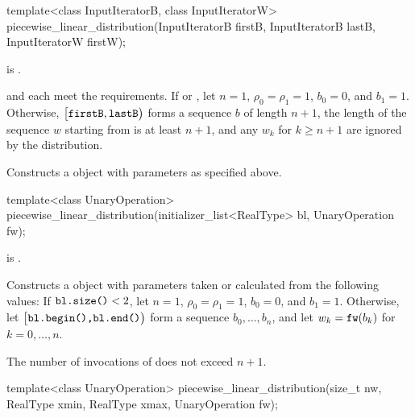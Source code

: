 \begin{itemdecl}
template<class InputIteratorB, class InputIteratorW>
 piecewise_linear_distribution(InputIteratorB firstB, InputIteratorB lastB,
                               InputIteratorW firstW);
\end{itemdecl}

\begin{itemdescr}
\pnum
\mandates
{} is .

\pnum
\expects
   and 
   each meet the
   requirements.
 If 
 or ,
 let $n = 1$,
     $\rho_0 = \rho_1 = 1$,
     $b_0 = 0$,
 and $b_1 = 1$.
 Otherwise,
 $\bigl[\texttt{\protect firstB}, \texttt{\protect lastB}\bigr)$
 forms a sequence $b$ of length $n+1$,
 the length of the sequence $w$ starting from 
 is at least $n+1$,
 and any $w_k$ for $k \geq n + 1$ are ignored by the distribution.

\pnum
\effects
Constructs a  object
 with parameters as specified above.
\end{itemdescr}


%
\begin{itemdecl}
template<class UnaryOperation>
 piecewise_linear_distribution(initializer_list<RealType> bl, UnaryOperation fw);
\end{itemdecl}

\begin{itemdescr}
\pnum
\mandates
{} is .

\pnum
\effects
Constructs a  object
 with parameters taken or calculated
 from the following values:
 If $\texttt{\protect bl.size()} < 2$,
 let $n = 1$,
     $\rho_0 = \rho_1 = 1$,
     $b_0 = 0$,
 and $b_1 = 1$.
 Otherwise,
 let $\bigl[\texttt{\protect bl.begin(),} \texttt{\protect bl.end()}\bigr)$
 form a sequence $b_0, \dotsc, b_n$,
 and
 let $w_k = \texttt{\protect fw}(b_k)$
 for $k = 0, \dotsc, n$.

\pnum
\complexity
The number of invocations of  does not exceed $n+1$.
\end{itemdescr}


%
\begin{itemdecl}
template<class UnaryOperation>
 piecewise_linear_distribution(size_t nw, RealType xmin, RealType xmax, UnaryOperation fw);
\end{itemdecl}

